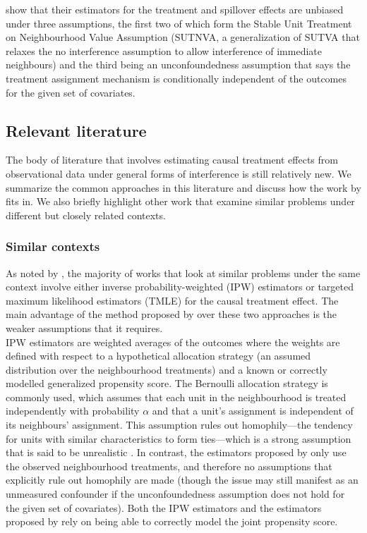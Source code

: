 \documentclass[10pt]{article}
\begin{document}
\textcite{Forastiere:2021} show that their estimators for the treatment and spillover effects are unbiased under three assumptions, the first two of which form the Stable Unit Treatment on Neighbourhood Value Assumption (SUTNVA, a generalization of SUTVA that relaxes the no interference assumption to allow interference of immediate neighbours) and the third being an unconfoundedness assumption that says the treatment assignment mechanism is conditionally independent of the outcomes for the given set of covariates.

\subsection{Relevant literature}

The body of literature that involves estimating causal treatment effects from observational data under general forms of interference is still relatively new. We summarize the common approaches in this literature and discuss how the work by \textcite{Forastiere:2021} fits in. We also briefly highlight other work that examine similar problems under different but closely related contexts.

\subsubsection{Similar contexts}

As noted by \textcite{Forastiere:2021}, the majority of works that look at similar problems under the same context involve either inverse probability-weighted (IPW) estimators \parencite{Liu:2016} or targeted maximum likelihood estimators (TMLE) \parencite{VanDerLaan:2014,Sofrygin:2017,Ogburn:2017} for the causal treatment effect. The main advantage of the method proposed by \citeauthor{Forastiere:2021} over these two approaches is the weaker assumptions that it requires.
\\

IPW estimators are weighted averages of the outcomes where the weights are defined with respect to a hypothetical allocation strategy (an assumed distribution over the neighbourhood treatments) and a known or correctly modelled generalized propensity score. The Bernoulli allocation strategy \parencite{Tchetgen:2012} is commonly used, which assumes that each unit in the neighbourhood is treated independently with probability $\alpha$ and that a unit's assignment is independent of its neighbours' assignment. This assumption rules out homophily---the tendency for units with similar characteristics to form ties---which is a strong assumption that is said to be unrealistic \parencite{Shalizi:2011}. In contrast, the estimators proposed by \textcite{Forastiere:2021} only use the observed neighbourhood treatments, and therefore no assumptions that explicitly rule out homophily are made (though the issue may still manifest as an unmeasured confounder if the unconfoundedness assumption does not hold for the given set of covariates). Both the IPW estimators and the estimators proposed by \citeauthor{Forastiere:2021} rely on being able to correctly model the joint propensity score.
\\
\end{document}
